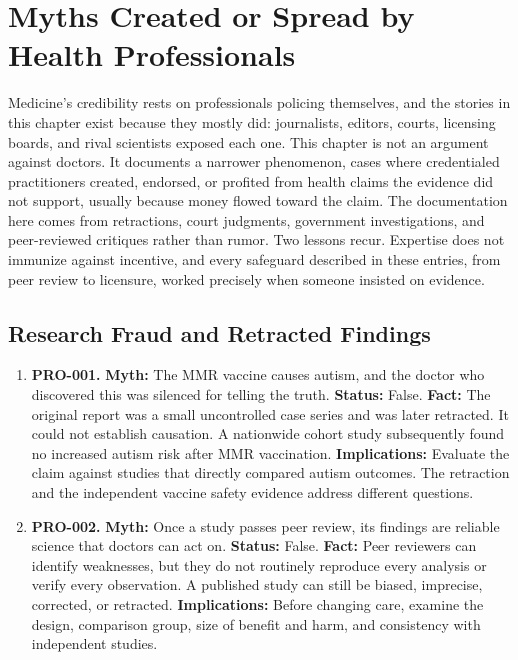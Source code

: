 \documentclass[11pt,oneside]{book}
\begin{document}
\chapter{Myths Created or Spread by Health Professionals}
Medicine's credibility rests on professionals policing themselves, and the stories in this chapter exist because they mostly did: journalists, editors, courts, licensing boards, and rival scientists exposed each one. This chapter is not an argument against doctors. It documents a narrower phenomenon, cases where credentialed practitioners created, endorsed, or profited from health claims the evidence did not support, usually because money flowed toward the claim. The documentation here comes from retractions, court judgments, government investigations, and peer-reviewed critiques rather than rumor. Two lessons recur. Expertise does not immunize against incentive, and every safeguard described in these entries, from peer review to licensure, worked precisely when someone insisted on evidence.

\section{Research Fraud and Retracted Findings}
\begin{enumerate}[leftmargin=0pt,labelwidth=0pt,labelsep=0pt,itemindent=0pt]
\item[] \textbf{PRO-001.} \textbf{Myth:} The MMR vaccine causes autism, and the doctor who discovered this was silenced for telling the truth.\newline
\textbf{Status:} False.\newline
\textbf{Fact:} The original report was a small uncontrolled case series and was later retracted. It could not establish causation. A nationwide cohort study subsequently found no increased autism risk after MMR vaccination. \cite{ref151,ref487}\newline
\textbf{Implications:} Evaluate the claim against studies that directly compared autism outcomes. The retraction and the independent vaccine safety evidence address different questions.
\item[] \textbf{PRO-002.} \textbf{Myth:} Once a study passes peer review, its findings are reliable science that doctors can act on.\newline
\textbf{Status:} False.\newline
\textbf{Fact:} Peer reviewers can identify weaknesses, but they do not routinely reproduce every analysis or verify every observation. A published study can still be biased, imprecise, corrected, or retracted. \cite{ref152}\newline
\textbf{Implications:} Before changing care, examine the design, comparison group, size of benefit and harm, and consistency with independent studies.
\end{enumerate}
\end{document}
